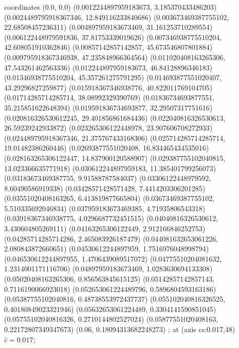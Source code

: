  coordinates {
    (0.0, 0.0)
    (0.0012244897959183673, 3.185370433486203)
    (0.0024489795918367346, 12.849116233840686)
    (0.003673469387755102, 22.68508457236311)
    (0.004897959183673469, 31.161253710289554)
    (0.006122448979591836, 37.81753339019626)
    (0.007346938775510204, 42.608051910362846)
    (0.00857142857142857, 45.673546807801884)
    (0.009795918367346938, 47.235848966364564)
    (0.011020408163265306, 47.543261462563336)
    (0.012244897959183673, 46.84128896346183)
    (0.01346938775510204, 45.357261275791295)
    (0.014693877551020407, 43.29296827259877)
    (0.015918367346938776, 40.822011769104705)
    (0.01714285714285714, 38.08992329390769)
    (0.01836734693877551, 35.215851622648394)
    (0.019591836734693877, 32.29507317751616)
    (0.020816326530612245, 29.401856861684436)
    (0.022040816326530613, 26.59239242933872)
    (0.023265306122448978, 23.907606708272933)
    (0.024489795918367346, 21.375767433168306)
    (0.025714285714285714, 19.01482386260446)
    (0.02693877551020408, 16.834465434535016)
    (0.028163265306122447, 14.837900120588907)
    (0.029387755102040815, 13.023366635771918)
    (0.030612244897959183, 11.385401799256073)
    (0.03183673469387755, 9.91588787584037)
    (0.03306122448979592, 8.60490586919338)
    (0.03428571428571428, 7.4414203306201285)
    (0.03551020408163265, 6.413819877665804)
    (0.03673469387755102, 5.510335692046834)
    (0.037959183673469385, 4.71935806543318)
    (0.03918367346938775, 4.0296687732451515)
    (0.04040816326530612, 3.430604805269111)
    (0.04163265306122449, 2.912166846252753)
    (0.04285714285714286, 2.465083926187479)
    (0.044081632653061226, 2.080843872660651)
    (0.04530612244897959, 1.7516976048998794)
    (0.046530612244897955, 1.4706439089517072)
    (0.04775510204081632, 1.2314001171116706)
    (0.04897959183673469, 1.0283630694133308)
    (0.05020408163265306, 0.856563845615125)
    (0.05142857142857143, 0.7116190066923018)
    (0.052653061224489796, 0.5896804593163186)
    (0.05387755102040816, 0.48738553972437737)
    (0.055102040816326525, 0.40180849023321946)
    (0.05632653061224489, 0.3304141590851045)
    (0.05755102040816326, 0.2710144802527024)
    (0.05877551020408163, 0.22172807349347673)
    (0.06, 0.18094313682248273)
};
 at (axis cs:0.017,48){\small{$\hat{c} = 0.017$}};